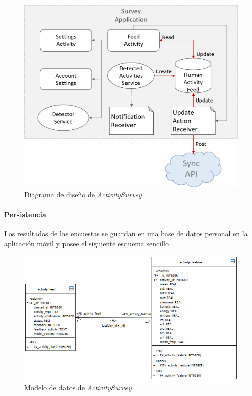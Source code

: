 \begin{figure}[H]
\begin{centering}
\includegraphics[width=1\columnwidth]{capitulo-5/graphics/act_surv_diag}
\par\end{centering}
\caption[Diagrama de diseño de ActivitySurvey]{\label{fig5:act-surv-diag}Diagrama de diseño de \emph{ActivitySurvey}}

\end{figure}


\paragraph{Persistencia}

Los resultados de las encuestas se guardan en una base de datos personal
en la aplicación móvil y posee el siguiente esquema sencillo .

\begin{figure}[H]
\begin{centering}
\includegraphics[width=1\columnwidth]{capitulo-5/graphics/act_surv_er}
\par\end{centering}
\caption[Modelo de datos de ActivitySurvey]{\label{fig5:act-surv-er}Modelo de datos de \emph{ActivitySurvey}}

\end{figure}



